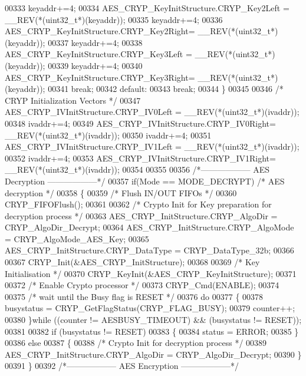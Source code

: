 \begin{DoxyCode}
00333     keyaddr+=4;
00334     AES\_CRYP\_KeyInitStructure.CRYP_Key2Left = \_\_REV(*(uint32\_t*)(keyaddr));
00335     keyaddr+=4;
00336     AES\_CRYP\_KeyInitStructure.CRYP_Key2Right= \_\_REV(*(uint32\_t*)(keyaddr));
00337     keyaddr+=4;
00338     AES\_CRYP\_KeyInitStructure.CRYP_Key3Left = \_\_REV(*(uint32\_t*)(keyaddr));
00339     keyaddr+=4;
00340     AES\_CRYP\_KeyInitStructure.CRYP_Key3Right= \_\_REV(*(uint32\_t*)(keyaddr));
00341     \textcolor{keywordflow}{break};
00342     \textcolor{keywordflow}{default}:
00343     \textcolor{keywordflow}{break};
00344   \}
00345 
00346   \textcolor{comment}{/* CRYP Initialization Vectors */}
00347   AES\_CRYP\_IVInitStructure.CRYP_IV0Left = \_\_REV(*(uint32\_t*)(ivaddr));
00348   ivaddr+=4;
00349   AES\_CRYP\_IVInitStructure.CRYP_IV0Right= \_\_REV(*(uint32\_t*)(ivaddr));
00350   ivaddr+=4;
00351   AES\_CRYP\_IVInitStructure.CRYP_IV1Left = \_\_REV(*(uint32\_t*)(ivaddr));
00352   ivaddr+=4;
00353   AES\_CRYP\_IVInitStructure.CRYP_IV1Right= \_\_REV(*(uint32\_t*)(ivaddr));
00354 
00355 
00356   \textcolor{comment}{/*------------------ AES Decryption ------------------*/}
00357   \textcolor{keywordflow}{if}(Mode == MODE_DECRYPT) \textcolor{comment}{/* AES decryption */}
00358   \{
00359     \textcolor{comment}{/* Flush IN/OUT FIFOs */}
00360     CRYP_FIFOFlush();
00361 
00362     \textcolor{comment}{/* Crypto Init for Key preparation for decryption process */}
00363     AES\_CRYP\_InitStructure.CRYP_AlgoDir = CRYP_AlgoDir_Decrypt;
00364     AES\_CRYP\_InitStructure.CRYP_AlgoMode = CRYP_AlgoMode_AES_Key;
00365     AES\_CRYP\_InitStructure.CRYP_DataType = CRYP_DataType_32b;
00366 
00367     CRYP_Init(&AES\_CRYP\_InitStructure);
00368 
00369     \textcolor{comment}{/* Key Initialisation */}
00370     CRYP_KeyInit(&AES\_CRYP\_KeyInitStructure);
00371 
00372     \textcolor{comment}{/* Enable Crypto processor */}
00373     CRYP_Cmd(ENABLE);
00374 
00375     \textcolor{comment}{/* wait until the Busy flag is RESET */}
00376     \textcolor{keywordflow}{do}
00377     \{
00378       busystatus = CRYP_GetFlagStatus(CRYP_FLAG_BUSY);
00379       counter++;
00380     \}\textcolor{keywordflow}{while} ((counter != AESBUSY_TIMEOUT) && (busystatus != RESET));
00381 
00382     \textcolor{keywordflow}{if} (busystatus != RESET)
00383    \{
00384        status = ERROR;
00385     \}
00386     \textcolor{keywordflow}{else}
00387     \{
00388       \textcolor{comment}{/* Crypto Init for decryption process */}  
00389       AES\_CRYP\_InitStructure.CRYP_AlgoDir = CRYP_AlgoDir_Decrypt;
00390     \}
00391   \}
00392   \textcolor{comment}{/*------------------ AES Encryption ------------------*/}

\end{DoxyCode}

